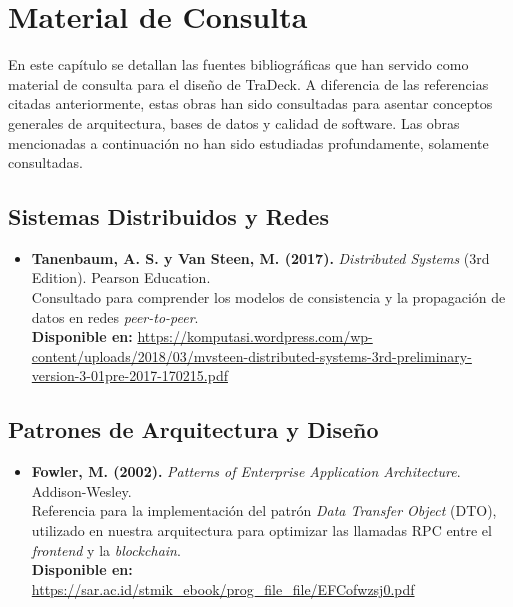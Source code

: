 \chapter{Material de Consulta}\label{cap:material_consulta}

En este capítulo se detallan las fuentes bibliográficas que han servido como material de consulta para el diseño de TraDeck. A diferencia de las referencias citadas anteriormente, estas obras han sido consultadas para asentar conceptos generales de arquitectura, bases de datos y calidad de software. Las obras mencionadas a continuación no han sido estudiadas profundamente, solamente consultadas.

\section{Sistemas Distribuidos y Redes}
\begin{itemize}
	\raggedright
	\item \textbf{Tanenbaum, A. S. y Van Steen, M. (2017).} \textit{Distributed Systems} (3rd Edition). Pearson Education.\medskip  \\
	Consultado para comprender los modelos de consistencia y la propagación de datos en redes \textit{peer-to-peer}.\medskip \\ 
	\textbf{Disponible en:} \url{https://komputasi.wordpress.com/wp-content/uploads/2018/03/mvsteen-distributed-systems-3rd-preliminary-version-3-01pre-2017-170215.pdf}
\end{itemize}

\section{Patrones de Arquitectura y Diseño}
\begin{itemize}
	\raggedright
	\item \textbf{Fowler, M. (2002).} \textit{Patterns of Enterprise Application Architecture}. Addison-Wesley. \medskip \\
	Referencia para la implementación del patrón \textit{Data Transfer Object} (DTO), utilizado en nuestra arquitectura para optimizar las llamadas RPC entre el \textit{frontend} y la \textit{blockchain}. \medskip \\
	\textbf{Disponible en:} \url{https://sar.ac.id/stmik_ebook/prog_file_file/EFCofwzsj0.pdf}
\end{itemize}

